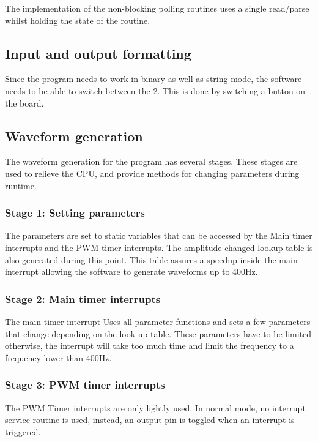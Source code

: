 The implementation of the non-blocking polling routines uses a single read/parse whilst
holding the state of the routine.

\subsection{Input and output formatting}
Since the program needs to work in binary as well as string mode, the software needs to
be able to switch between the 2. This is done by switching a button on the board.

\subsection{Waveform generation}
The waveform generation for the program has several stages. These stages are used
to relieve the CPU, and provide methods for changing parameters during runtime.
\subsubsection{Stage 1: Setting parameters}
The parameters are set to static variables that can be accessed by the Main timer interrupts
and the PWM timer interrupts. The amplitude-changed lookup table is also generated during this
point. This table assures a speedup inside the main interrupt allowing the software to generate
waveforms up to 400Hz.
\subsubsection{Stage 2: Main timer interrupts}
The main timer interrupt Uses all parameter functions and sets a few parameters that change
depending on the look-up table. These parameters have to be limited otherwise, the interrupt
will take too much time and limit the frequency to a frequency lower than 400Hz.
\subsubsection{Stage 3: PWM timer interrupts}
The PWM Timer interrupts are only lightly used. In normal mode, no interrupt service routine is used, instead, an output pin is toggled when an interrupt is triggered.
